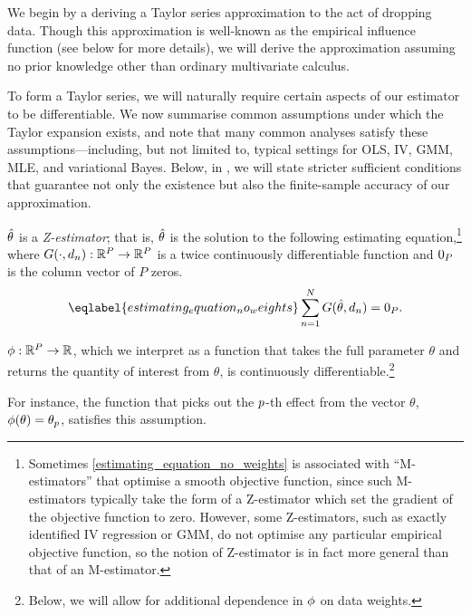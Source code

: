 We begin by a deriving a Taylor series approximation to the act of dropping
data.  Though this approximation is well-known as the empirical influence
function (see  below for more details), we will
derive the approximation assuming no prior knowledge other than ordinary
multivariate calculus.

To form a Taylor series, we will naturally require certain aspects of our
estimator to be differentiable. We now summarise common assumptions under which
the Taylor expansion exists, and note that many common analyses satisfy these
assumptions---including, but not limited to, typical settings for OLS, IV, GMM,
MLE, and variational Bayes. Below, in , we will state stricter
sufficient conditions that guarantee not only the existence but also the
finite-sample accuracy of our approximation.
%
\begin{assu}
%
$\hat{\theta}$ is a \emph{Z-estimator}; that is, $\hat{\theta}$ is the solution to the
following estimating equation,\footnote{Sometimes
\eqref{estimating_equation_no_weights} is associated with ``M-estimators'' that
optimise a smooth objective function, since such M-estimators typically take the
form of a Z-estimator which set the gradient of the objective function to zero.
However, some Z-estimators, such as exactly identified IV regression or GMM, do
not optimise any particular empirical objective function, so the notion of
Z-estimator is in fact more general than that of an M-estimator.} where
$G(\cdot, d_{n}): \mathbb{R}^{P} \rightarrow \mathbb{R}^{P}$ is a twice
continuously differentiable function and $0_{P}$ is the column vector of $P$
zeros.
%
\begin{align}\eqlabel{estimating_equation_no_weights}
%
\sumn G(\thetahat, \d_{n}) =  \zP .
%
\end{align}
\end{assu}
%
\begin{assu}
%
	$\phi: \mathbb{R}^{P} \rightarrow \mathbb{R}$, which we interpret as a
	function that takes the full parameter $\theta$ and returns the quantity of
	interest from $\theta$, is continuously differentiable.\footnote{Below, we
	will allow for additional dependence in $\phi$ on data weights.}
%
\end{assu}
%
For instance, the function that picks out the $p$-th effect from the vector
$\theta$, $\phi(\theta) = \theta_{p}$, satisfies this assumption.

